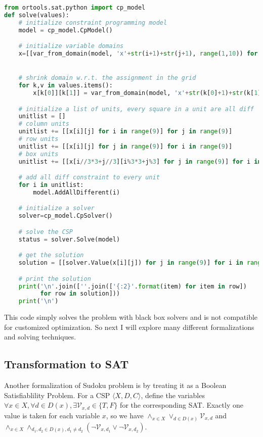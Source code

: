 \documentclass[a4paper, 12pt]{report}
\begin{document}
            \begin{lstlisting}[frame=single,language=python]
from ortools.sat.python import cp_model
def solve(values):
    # initialize constraint programming model
    model = cp_model.CpModel()

    # initialize variable domains
    x=[[var_from_domain(model, 'x'+str(i+1)+str(j+1), range(1,10)) for j in range(9)] for i in range(9)]


    # shrink domain w.r.t. the assignment in the grid
    for k,v in values.items():
        x[k[0]][k[1]] = var_from_domain(model, 'x'+str(k[0]+1)+str(k[1]+1), [v])

    # initialize a list of units, every square in a unit are all diff
    unitlist = []
    # column units
    unitlist += [[x[i][j] for i in range(9)] for j in range(9)]
    # row units
    unitlist += [[x[i][j] for j in range(9)] for i in range(9)]
    # box units
    unitlist += [[x[i//3*3+j//3][i%3*3+j%3] for j in range(9)] for i in range(9)]

    # add all diff constraint to every unit
    for i in unitlist:
        model.AddAllDifferent(i)

    # initialize a solver
    solver=cp_model.CpSolver()

    # solve the CSP
    status = solver.Solve(model)

    # get the solution
    solution = [[solver.Value(x[i][j]) for j in range(9)] for i in range(9)]

    # print the solution
    print('\n'.join([''.join(['{:2}'.format(item) for item in row])
          for row in solution]))
    print('\n')
            \end{lstlisting}
            This code simply solves the problem with black box solvers and is not compatible for customized optimization. So next I will explore many different formalizations and solving techniques.

        \subsection {Transformation to SAT}
            Another formalization of Sudoku problem is by treating it as a Boolean Satisfiablility Problem\cite{lardeux2008overlapping, lynce2006sudoku}. For a CSP $\langle X,D,C\rangle$, define the variables $\forall x\in X, \forall d\in D(x), \exists\mathcal V_{x,d}\in \{T,F\}$ for the corresponding SAT. Exactly one value is taken for each variable $x$, so we have $\land_{x\in X}\vee_{d\in D(x)} \mathcal V_{x,d}$ and $\land_{x\in X}\land_{d_1,d_2\in
            D(x),d_1\neq d_2}(\neg \mathcal V_{x,d_1} \vee \neg \mathcal V_{x,d_2})$.
\end{document}
